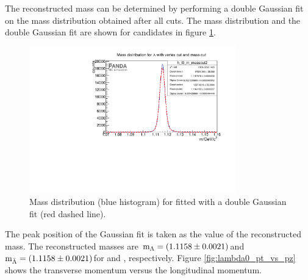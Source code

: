 		The reconstructed mass can be determined by performing a double Gaussian fit on the mass distribution obtained after all cuts.
		The mass distribution and the double Gaussian fit are shown for \lam candidates in figure \ref{fig:lambda0_massfit}.
		
		\begin{figure}
			\centering
				\includegraphics[width=0.8\textwidth]{./plots/lambda0/lambda0_m_masscut2.pdf}
			\caption{\propose Mass distribution (blue histogram) for \lam fitted with a double Gaussian fit (red dashed line).}
			\label{fig:lambda0_massfit}
		\end{figure}
		
		The peak position of the Gaussian fit is taken as the value of the reconstructed mass.
		The reconstructed masses are $\textnormal{m}_{\Lambda} = \left(1.1158 \pm 0.0021\right)$\massunit and 
		$\textnormal{m}_{\bar{\Lambda}} = \left(1.1158 \pm 0.0021\right)$\massunit for \lam and \alam, respectively. 
		Figure \ref{fig:lambda0_pt_vs_pz} shows the transverse momentum versus the longitudinal momentum.
				
